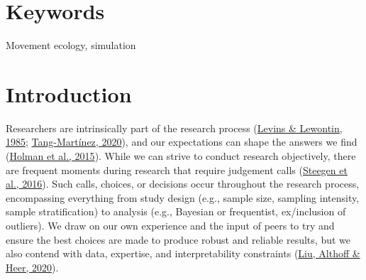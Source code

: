 \documentclass[10pt,a4paper]{article}
\begin{document}
\section*{Keywords}

Movement ecology, simulation

\clearpage
\pagestyle{fancy}

\hypertarget{introduction}{%
\section{Introduction}\label{introduction}}

Researchers are intrinsically part of the research process (\protect\hyperlink{ref-levins_dialectical_1985}{Levins \& Lewontin, 1985}; \protect\hyperlink{ref-tang-martinez_history_2020}{Tang-Martínez, 2020}), and our expectations can shape the answers we find (\protect\hyperlink{ref-holman_evidence_2015}{Holman et al., 2015}).
While we can strive to conduct research objectively, there are frequent moments during research that require judgement calls (\protect\hyperlink{ref-steegen_increasing_2016}{Steegen et al., 2016}).
Such calls, choices, or decisions occur throughout the research process, encompassing everything from study design (e.g., sample size, sampling intensity, sample stratification) to analysis (e.g., Bayesian or frequentist, ex/inclusion of outliers).
We draw on our own experience and the input of peers to try and ensure the best choices are made to produce robust and reliable results, but we also contend with data, expertise, and interpretability constraints (\protect\hyperlink{ref-liu_paths_2020}{Liu, Althoff \& Heer, 2020}).
\end{document}
